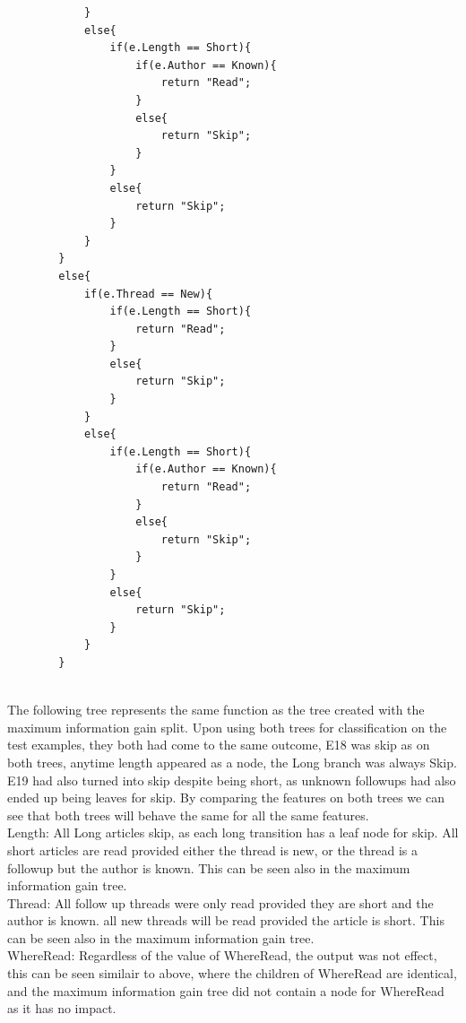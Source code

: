 \documentclass{article}
\newcommand*\fixindent{ \hspace{1pt}\\}
\begin{document}
\begin{enumerate}[(a)]
\begin{lstlisting}
            }
            else{
                if(e.Length == Short){
                    if(e.Author == Known){
                        return "Read";
                    }
                    else{
                        return "Skip";
                    }
                }
                else{
                    return "Skip";
                }
            }
        }
        else{
            if(e.Thread == New){
                if(e.Length == Short){
                    return "Read";
                }
                else{
                    return "Skip";
                }
            }
            else{
                if(e.Length == Short){
                    if(e.Author == Known){
                        return "Read";
                    }
                    else{
                        return "Skip";
                    }
                }
                else{
                    return "Skip";
                }
            }
        }
    \end{lstlisting}\fixindent{}
The following tree represents the same function as the tree created with the maximum information gain split. Upon using both trees for classification on the test examples, they both had come to the same outcome, E18 was skip as on both trees, anytime length appeared as a node, the Long branch was always Skip. E19 had also turned into skip despite being short, as unknown  followups had also ended up being leaves for skip. By comparing the features on both trees we can see that both trees will behave the same for all the same features.\\

Length: All Long articles skip, as each long transition has a leaf node for skip. All short articles are read provided either the thread is new, or the thread is a followup but the author is known. This can be seen also in the maximum information gain tree.\\

Thread: All follow up threads were only read provided they are short and the author is known. all new threads will be read provided the article is short. This can be seen also in the maximum information gain tree.\\

WhereRead: Regardless of the value of WhereRead, the output was not effect, this can be seen similair to above, where the children of WhereRead are identical, and the maximum information gain tree did not contain a node for WhereRead as it has no impact.\\


\end{enumerate}
\end{document}
